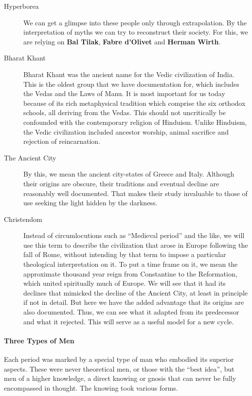 \begin{description}
\item[Hyperborea ]

We can get a glimpse into these people only through extrapolation. By the interpretation of myths we can try to reconstruct their society. For this, we are relying on \textbf{Bal Tilak}, \textbf{Fabre d'Olivet} and \textbf{Herman Wirth}. 

\item[Bharat Khant ]

Bharat Khant was the ancient name for the Vedic civilization of India. This is the oldest group that we have documentation for, which includes the Vedas and the Laws of Manu. It is most important for us today because of its rich metaphysical tradition which comprise the six orthodox schools, all deriving from the Vedas. This should not uncritically be confounded with the contemporary religion of Hinduism. Unlike Hinduism, the Vedic civilization included ancestor worship, animal sacrifice and rejection of reincarnation. 

\item[The Ancient City ]

By this, we mean the ancient city-states of Greece and Italy. Although their origins are obscure, their traditions and eventual decline are reasonably well documented. That makes their study invaluable to those of use seeking the light hidden by the darkness. 

\item[Christendom ]

Instead of circumlocutions such as “Medieval period” and the like, we will use this term to describe the civilization that arose in Europe following the fall of Rome, without intending by that term to impose a particular theological interpretation on it. To put a time frame on it, we mean the approximate thousand year reign from Constantine to the Reformation, which united spiritually much of Europe. We will see that it had its declines that mimicked the decline of the Ancient City, at least in principle if not in detail. But here we have the added advantage that its origins are also documented. Thus, we can see what it adapted from its predecessor and what it rejected. This will serve as a useful model for a new cycle. 

\end{description}
\paragraph{Three Types of Men}
Each period was marked by a special type of man who embodied its superior aspects. These were never theoretical men, or those with the “best idea”, but men of a higher knowledge, a direct knowing or gnosis that can never be fully encompassed in thought. The knowing took various forms.

